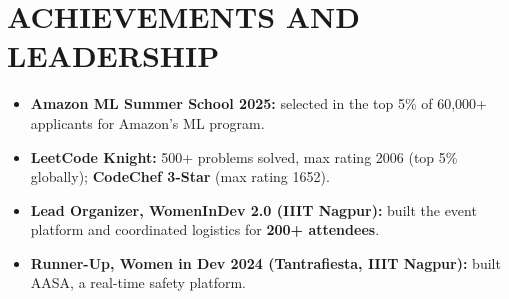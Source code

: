 \documentclass[letterpaper,11pt]{article}
\newcommand{\resumeItem}[1]{\item\small{#1 \vspace{-2pt}}}
\begin{document}
\section{ACHIEVEMENTS AND LEADERSHIP}
 \begin{itemize}[leftmargin=0.15in, itemsep=0pt, topsep=2pt, label=\textbullet]
    \resumeItem{\textbf{Amazon ML Summer School 2025:} selected in the top 5\% of 60,000+ applicants for Amazon's ML program.}
    \resumeItem{\textbf{LeetCode Knight:} 500+ problems solved, max rating 2006 (top 5\% globally); \textbf{CodeChef 3-Star} (max rating 1652).}
    \resumeItem{\textbf{Lead Organizer, WomenInDev 2.0 (IIIT Nagpur):} built the event platform and coordinated logistics for \textbf{200+ attendees}.}
    \resumeItem{\textbf{Runner-Up, Women in Dev 2024 (Tantrafiesta, IIIT Nagpur):} built AASA, a real-time safety platform.}
 \end{itemize}
\end{document}
